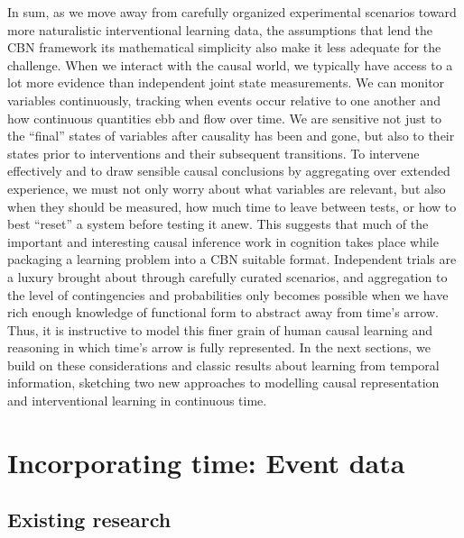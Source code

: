 \documentclass{cambridge7A}%
\begin{document}
In sum, as we move away from carefully organized experimental scenarios toward more naturalistic interventional learning data, the assumptions that lend the CBN framework its mathematical simplicity also make it less adequate for the challenge.  
When we interact with the causal world, we typically have access to a lot more evidence than independent joint state measurements.  We can monitor variables continuously, tracking when events occur relative to one another and how continuous quantities ebb and flow over time.  We are sensitive not just to the ``final'' states of variables after causality has been and gone, but also to their states prior to interventions and their subsequent transitions.  To intervene effectively and to draw sensible causal conclusions by aggregating over extended experience, we must not only worry about what variables are relevant, but also when they should be measured, how much time to leave between tests, or how to best ``reset'' a system before testing it anew. 
This suggests that much of the important and interesting causal inference work in cognition takes place while packaging a learning problem into a CBN suitable format.  Independent trials are a luxury brought about through carefully curated scenarios, and aggregation to the level of contingencies and probabilities only becomes possible when we have rich enough knowledge of functional form to abstract away from time's arrow.  Thus, it is instructive to model this finer grain of human causal learning and reasoning in which time's arrow is fully represented.  
In the next sections, we build on these considerations and classic results about learning from temporal information, sketching two new approaches to modelling causal representation and interventional learning in continuous time.


\section{Incorporating time: Event data}\label{section:DN}

\subsection{Existing research}
\end{document}
